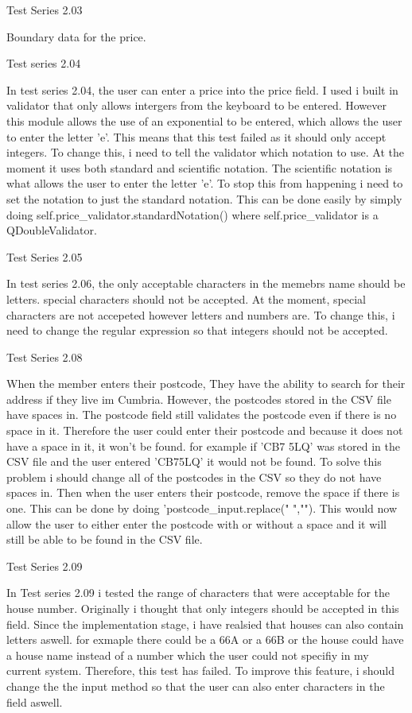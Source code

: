 \begin{flushleft}
Test Series 2.03

Boundary data for the price.


Test series 2.04

In test series 2.04, the user can enter a price into the price field. I used i built in validator that only allows intergers from the keyboard to be entered. However this module allows the use of an exponential to be entered, which allows the user to enter the letter 'e'. This means that this test failed as it should only accept integers. To change this, i need to tell the validator which notation to use. At the moment it uses both standard and scientific notation. The scientific notation is what allows the user to enter the letter 'e'. To stop this from happening i need to set the notation to just the standard notation. This can be done easily by simply doing self.price_validator.standardNotation() where self.price_validator is a QDoubleValidator.

Test Series 2.05

In test series 2.06, the only acceptable characters in the memebrs name should be letters. special characters should not be accepted. At the moment, special characters are not accepeted however letters and numbers are. To change this, i need to change the regular expression so that integers should not be accepted.

Test Series 2.08

When the member enters their postcode, They have the ability to search for their address if they live im Cumbria. However, the postcodes stored in the CSV file have spaces in. The postcode field still validates the postcode even if there is no space in it. Therefore the user could enter their postcode and because it does not have a space in it, it won't be found. for example if 'CB7 5LQ' was stored in the CSV file and the user entered 'CB75LQ' it would not be found. To solve this problem i should change all of the postcodes in the CSV so they do not have spaces in. Then when the user enters their postcode, remove the space if there is one. This can be done by doing 'postcode_input.replace(" ",""). This would now allow the user to either enter the postcode with or without a space and it will still be able to be found in the CSV file.

Test Series 2.09

In Test series 2.09 i tested the range of characters that were acceptable for the house number. Originally i thought that only integers should be accepted in this field. Since the implementation stage, i have realsied that houses can also contain letters aswell. for exmaple there could be a 66A or a 66B or the house could have a house name instead of a number which the user could not specifiy in my current system. Therefore,  this test has failed. To improve this feature, i should change the the input method so that the user can also enter characters in the field aswell.


\end{flushleft}
